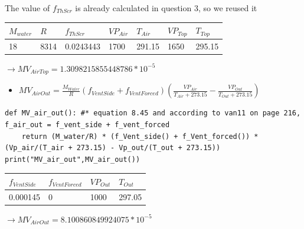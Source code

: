 \documentclass[a4paper]{article}
\numberwithin{equation}{section}
\begin{document}
The value of $f_{ThScr}$ is already calculated in question 3, so we reused it

\begin{table}[H]
\centering
\begin{tabular}{|l|l|l|l|l|l|l|}
\hline
\rowcolor[HTML]{FFFC9E} 
\textbf{$M_{water}$} & \textbf{$R$} & \cellcolor[HTML]{FFFC9E}\textbf{$f_{ThScr}$} & \cellcolor[HTML]{FFFC9E}\textbf{$VP_{Air}$}& \cellcolor[HTML]{FFFC9E}\textbf{$T_{Air}$}& \cellcolor[HTML]{FFFC9E}\textbf{$VP_{Top}$}& \cellcolor[HTML]{FFFC9E}\textbf{$T_{Top}$}\\ \hline
18            & 8314               &0.0243443             &1700      &291.15  & 1650 & 295.15                \\ \hline
\end{tabular}
\end{table}
$\rightarrow MV_{AirTop} = 1.3098215855448786*10^{-5}$


\begin{itemize}
    \item $MV_{AirOut} = \frac{M_{Water}}{R} (f_{VentSide} + f_{VentForced}) \left(\frac{VP_{Air}}{T_{Air} + 273.15} - \frac{VP_{Out}}{T_{Out} + 273.15}\right)   $
\end{itemize}
\begin{mdframed}[leftline=false,rightline=false,backgroundcolor=cyan!10]
  \begin{verbatim}
def MV_air_out(): #* equation 8.45 and according to van11 on page 216, f_air_out = f_vent_side + f_vent_forced
    return (M_water/R) * (f_Vent_side() + f_Vent_forced()) * (Vp_air/(T_air + 273.15) - Vp_out/(T_out + 273.15))
print("MV_air_out",MV_air_out())
\end{verbatim}
\end{mdframed}

\begin{table}[H]
\centering
\begin{tabular}{|l|l|l|l|}
\hline 
\rowcolor[HTML]{FFFC9E} 
\textbf{$f_{VentSide}$} & \textbf{$f_{VentForced}$} & 
\cellcolor[HTML]{FFFC9E}\textbf{$VP_{Out}$} &
\cellcolor[HTML]{FFFC9E}\textbf{$T_{Out}$}\\ \hline
0.000145                      & 0           &1000   & 297.05                  \\ \hline
\end{tabular}
\end{table}
$\rightarrow MV_{AirOut} = 8.100860849924075*10^{-5}$
\end{document}
